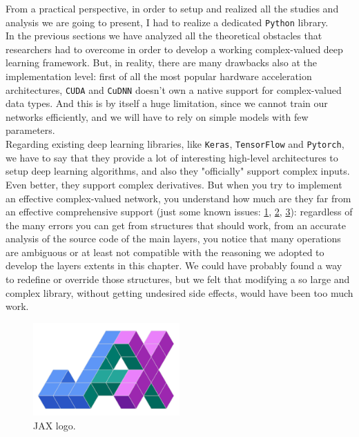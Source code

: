 \documentclass[../main.tex]{subfiles}
\begin{document}
From a practical perspective, in order to setup and realized all the studies and analysis we are going to present, I had to realize a dedicated \texttt{Python} library.\\
In the previous sections we have analyzed all the theoretical obstacles that researchers had to overcome in order to develop a working complex-valued deep learning framework. But, in reality, there are many drawbacks also at the implementation level: first of all the most popular hardware acceleration architectures, \texttt{CUDA} and \texttt{CuDNN} doesn't own a native support for complex-valued data types. And this is by itself a huge limitation, since we cannot train our networks efficiently, and we will have to rely on simple models with few parameters.\\
Regarding existing deep learning libraries, like \texttt{Keras}, \texttt{TensorFlow} and \texttt{Pytorch}, we have to say that they provide a lot of interesting high-level architectures to setup deep learning algorithms, and also they "officially" support complex inputs. Even better, they support complex derivatives. But when you try to implement an effective complex-valued network, you understand how much are they far from an effective comprehensive support (just some known issues: \href{https://github.com/pytorch/pytorch/issues/33152}{1}, \href{https://github.com/tensorflow/tensorflow/issues/17097}{2}, \href{https://github.com/microsoft/tensorflow-directml/issues/32}{3}): regardless of the many errors you can get from structures that should work, from an accurate analysis of the source code of the main layers, you notice that many operations are ambiguous or at least not compatible with the reasoning we adopted to develop the layers extents in this chapter. We could have probably found a way to redefine or override those structures, but we felt that modifying a so large and complex library, without getting undesired side effects, would have been too much work.
\begin{figure}
	\includegraphics[width=0.5\textwidth]{pictures/JAX_logo.pdf}
	\caption{JAX logo.}
\end{figure}
\end{document}
